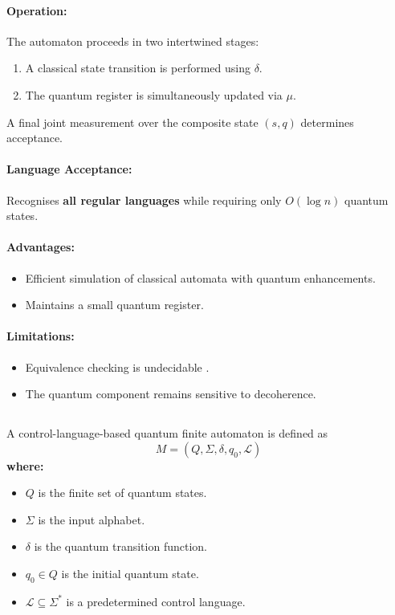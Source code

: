 \paragraph{Operation:}  
The automaton proceeds in two intertwined stages:
\begin{enumerate}
    \item A classical state transition is performed using \( \delta \).
    \item The quantum register is simultaneously updated via \( \mu \).
\end{enumerate}
A final joint measurement over the composite state \( (s, q) \) determines acceptance.

\paragraph{Language Acceptance:}  
Recognises \textbf{all regular languages} while requiring only \( O(\log n) \) quantum states.

\paragraph{Advantages:}
\begin{itemize}
    \item Efficient simulation of classical automata with quantum enhancements.
    \item Maintains a small quantum register.
\end{itemize}

\paragraph{Limitations:}
\begin{itemize}
    \item Equivalence checking is undecidable \cite{hirvensalo2008}.
    \item The quantum component remains sensitive to decoherence.
\end{itemize}
\cite{qiu2009}

\subsection{}
\label{subsec:cl-1qfa}
\begin{definition}
A control-language-based quantum finite automaton is defined as 
\[
M = (Q, \Sigma, \delta, q_0, \mathcal{L})
\]
\textbf{where:}
\begin{itemize}
    \item \( Q \) is the finite set of quantum states.
    \item \( \Sigma \) is the input alphabet.
    \item \( \delta \) is the quantum transition function.
    \item \( q_0 \in Q \) is the initial quantum state.
    \item \( \mathcal{L} \subseteq \Sigma^* \) is a predetermined control language.
\end{itemize}
\end{definition}


